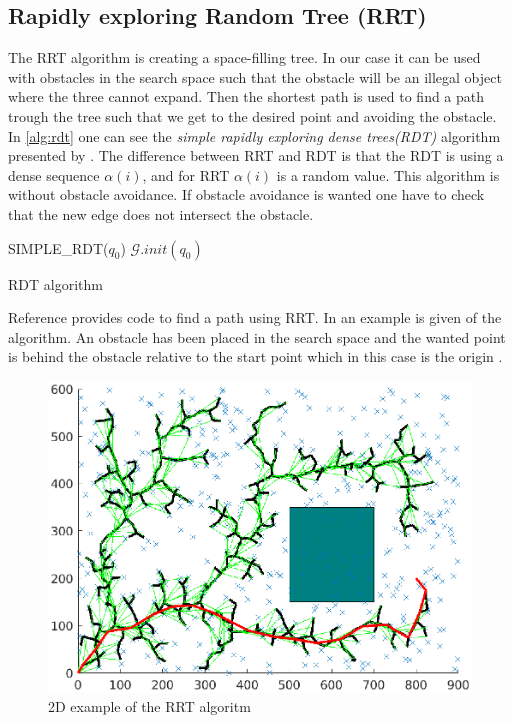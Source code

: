 \subsection{Rapidly exploring Random Tree (RRT)}
The RRT algorithm is creating a space-filling tree. In our case it can be used with obstacles in the search space such that the obstacle will be an illegal object where the three cannot expand. Then the shortest path is used to find a path trough the tree such that we get to the desired point and avoiding the obstacle. In \autoref{alg:rdt} one can see the \textit{simple rapidly exploring dense trees(RDT)} algorithm presented by \cite{Lavalle}. The difference between RRT and RDT is that the RDT is using a dense sequence $\alpha(i)$, and for RRT $\alpha(i)$ is a random value. This algorithm is without obstacle avoidance. If obstacle avoidance is wanted one have to check that the new edge does not intersect the obstacle. %
\begin{algorithm}[htbp]
 SIMPLE\_RDT($q_0$)\;
 $\mathcal{G}.init(q_0)$\;
 \caption{RDT algorithm}
 \label{alg:rdt}
\end{algorithm}

Reference \cite{rrt} provides code to find a path using RRT. In  an example is given of the algorithm. An obstacle has been placed in the search space and the wanted point is behind the obstacle relative to the start point which in this case is the origin \cite{rrt}.
\begin{figure}[htbp]
  \centering
  \includegraphics[width=.9\textwidth]{img/rrt2dex.eps}
  \caption{2D example of the RRT algoritm}
  \label{fig:rrt2dex}
\end{figure}

